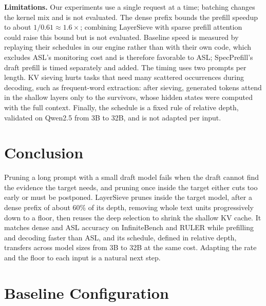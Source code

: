 \documentclass[10pt,conference]{IEEEtran}
\begin{document}
\textbf{Limitations.} Our experiments use a single request at a time; batching changes the kernel mix and is not evaluated. The dense prefix bounds the prefill speedup to about $1/0.61\approx1.6\times$; combining LayerSieve with sparse prefill attention~\cite{jiang2024minference,lai2025flexprefill} could raise this bound but is not evaluated. Baseline speed is measured by replaying their schedules in our engine rather than with their own code, which excludes ASL's monitoring cost and is therefore favorable to ASL; SpecPrefill's draft prefill is timed separately and added. The timing uses two prompts per length. KV sieving hurts tasks that need many scattered occurrences during decoding, such as frequent-word extraction: after sieving, generated tokens attend in the shallow layers only to the survivors, whose hidden states were computed with the full context. Finally, the schedule is a fixed rule of relative depth, validated on Qwen2.5 from 3B to 32B, and is not adapted per input.

\section{Conclusion}
\label{sec:conclusion}

Pruning a long prompt with a small draft model fails when the draft cannot find the evidence the target needs, and pruning once inside the target either cuts too early or must be postponed. LayerSieve prunes inside the target model, after a dense prefix of about 60\% of its depth, removing whole text units progressively down to a floor, then reuses the deep selection to shrink the shallow KV cache. It matches dense and ASL accuracy on InfiniteBench and RULER while prefilling and decoding faster than ASL, and its schedule, defined in relative depth, transfers across model sizes from 3B to 32B at the same cost. Adapting the rate and the floor to each input is a natural next step.



\appendices
\section{Baseline Configuration}
\label{app:baselines}
\end{document}
